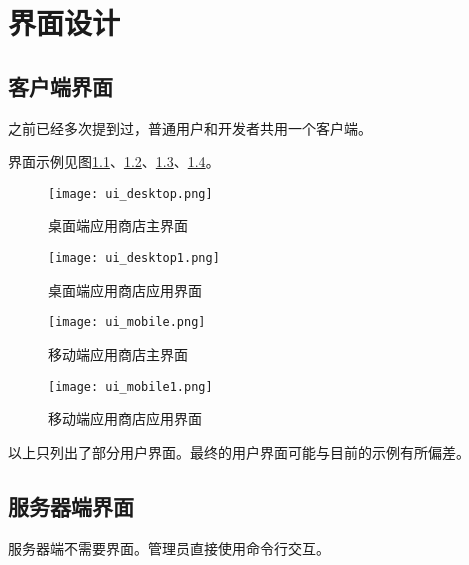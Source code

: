 \chapter{界面设计}
\section{客户端界面}
之前已经多次提到过，普通用户和开发者共用一个客户端。

界面示例见图\ref{fig:ui_desktop_home}、\ref{fig:ui_desktop_app}、\ref{fig:ui_mobile_home}、\ref{fig:ui_mobile_app}。

\begin{figure}[ht]
	\centering
	\texttt{[image: ui\_desktop.png]}
	\caption{桌面端应用商店主界面} \label{fig:ui_desktop_home}
\end{figure}

\begin{figure}[ht]
	\centering
	\texttt{[image: ui\_desktop1.png]}
	\caption{桌面端应用商店应用界面} \label{fig:ui_desktop_app}
\end{figure}

\begin{figure}[ht]
	\centering
	\texttt{[image: ui\_mobile.png]}
	\caption{移动端应用商店主界面} \label{fig:ui_mobile_home}
\end{figure}

\begin{figure}[ht]
	\centering
	\texttt{[image: ui\_mobile1.png]}
	\caption{移动端应用商店应用界面} \label{fig:ui_mobile_app}
\end{figure}

以上只列出了部分用户界面。最终的用户界面可能与目前的示例有所偏差。

\section{服务器端界面}
服务器端不需要界面。管理员直接使用命令行交互。


